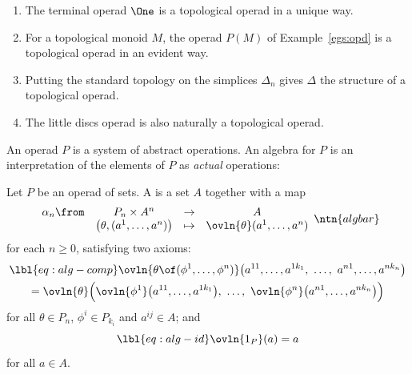 \begin{examples}
\begin{enumerate}
\item 
The terminal%
% 
%
% 
operad $\One$ is a topological operad in a unique way.

\item
For a topological monoid%
%
%
% 
$M$, the operad $P(M)$ of Example~\ref{egs:opd} is a
topological operad in an evident way.

\item
Putting the standard topology on the simplices%
%
%
%
% 
$\Delta_n$ gives $\Delta$
the structure of a topological operad.

\item
The little%
%
%
% 
discs operad is also naturally a topological operad.
\end{enumerate}
\end{examples}

An operad $P$ is a system of abstract operations.  An algebra for $P$ is an
interpretation of the elements of $P$ as \emph{actual} operations:

\begin{defn}
Let $P$ be an operad of sets.  A %
%
% 
is a set $A$ together with a map
\[
\begin{array}{cccc}
\alpha_n \from  &P_n \times A^n &\to    &A      \\
&
\bigl(\theta, (a^1, \ldots, a^n)\bigr)  &\mapsto        &
\ovln{\theta}(a^1, \ldots, a^n)
\end{array}
\ntn{algbar}
\]
for each $n \geq 0$, satisfying two axioms:
% 
\begin{multline}
\lbl{eq:alg-comp}
\ovln{\theta \of (\phi^1, \ldots, \phi^n)}
\bigl(
a^{1 1}, \ldots, a^{1 k_1}, \ \ldots, \ a^{n 1}, \ldots, a^{n k_n}
\bigr)  \\
=
\ovln{\theta} \Bigl(
\ovln{\phi^1} \bigl( a^{1 1}, \ldots, a^{1 k_1} \bigr),
\ \ldots, \ 
\ovln{\phi^n} \bigl( a^{n 1}, \ldots, a^{n k_n} \bigr)
\Bigr)
\end{multline}
% 
for all $\theta \in P_n$, $\phi^i \in P_{k_i}$ and $a^{i j} \in A$; and
% 
\begin{equation}
\lbl{eq:alg-id}
\ovln{1_P}(a) = a
\end{equation}
% 
for all $a \in A$.
\end{defn}

